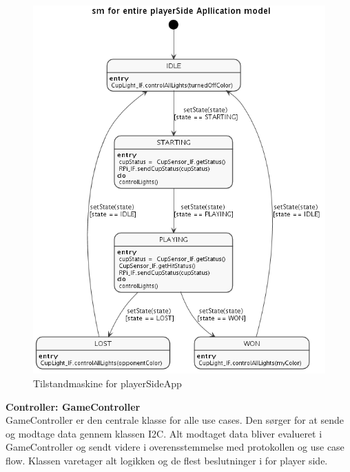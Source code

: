 \documentclass[Arkitektur/System_main.tex]{subfiles}
\begin{document}
\begin{figure}[H]
    \centering
    \includegraphics[width=\textwidth]{Arkitektur/Softwarearkitektur/Applikationsmodel/PlayerSide/graphics/state.png}
    \caption{Tilstandmaskine for playerSideApp}
    \label{fig:playerSide_SM}
\end{figure}


{\large\textbf{Controller:  GameController}}\\
GameController er den centrale klasse for alle use cases. Den sørger for at sende og modtage data gennem klassen I2C. Alt modtaget data bliver evalueret i GameController og sendt videre i overensstemmelse med protokollen og use case flow. Klassen varetager alt logikken og de flest beslutninger i for player side. 
\end{document}
